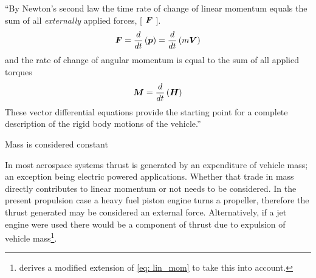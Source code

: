 \documentclass[12pt]{ucthesis}
\begin{document}
``By Newton's second law the time rate of change of linear momentum equals the sum of all \textit{externally} applied forces, [ $\boldsymbol{F}$ ].
%
	\begin{equation}
		\displaystyle \boldsymbol{F} = \frac{d}{dt}\left( \boldsymbol{p} \right) = \frac{d}{dt}\left( m \boldsymbol{V} \right)
		\label{eq: lin_mom}
	\end{equation}
%
\noindent and the rate of change of angular momentum is equal to the sum of all applied torques
%
	\begin{equation}
		\boldsymbol{M} = \frac{d}{dt} \left(\boldsymbol{H} \right)
		\label{eq: ang_mom}
	\end{equation}
%
These vector differential equations provide the starting point for a complete description of the rigid body motions of the vehicle.'' \citet{McRuer1973}
%
	\begin{ass}
		Mass is considered constant
		\label{ass: mass}
	\end{ass}
%
\noindent In most aerospace systems thrust is generated by an expenditure of vehicle mass; an exception being electric powered applications. Whether that trade in mass directly contributes to linear momentum or not needs to be considered. In the present propulsion case a heavy fuel piston engine turns a propeller, therefore the thrust generated may be considered an external force. Alternatively, if a jet engine were used there would be a component of thrust due to expulsion of vehicle mass\footnote{\citet{McRuer1973} derives a modified extension of \autoref{eq: lin_mom} to take this into account.}. 
%
%
%
\end{document}
